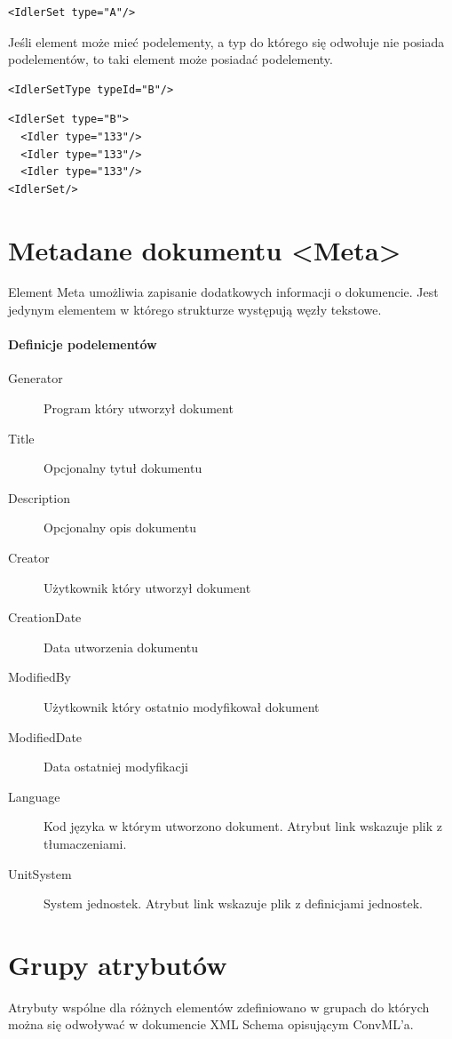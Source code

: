 \documentclass[12pt,a4paper]{article}
\begin{document}
\begin{verbatim}
<IdlerSet type="A"/>
\end{verbatim}

Jeśli element może mieć podelementy, a typ do którego się odwołuje nie posiada
podelementów, to taki element może posiadać podelementy.

\begin{verbatim}
<IdlerSetType typeId="B"/>
\end{verbatim}

\begin{verbatim}
<IdlerSet type="B">
  <Idler type="133"/>
  <Idler type="133"/>
  <Idler type="133"/>
<IdlerSet/>
\end{verbatim}

\section{Metadane dokumentu <Meta>}
Element Meta umożliwia zapisanie dodatkowych informacji o dokumencie. Jest
jedynym elementem w którego strukturze występują węzły tekstowe.

\paragraph{Definicje podelementów}
\begin{description}
\item[Generator] Program który utworzył dokument
\item[Title] Opcjonalny tytuł dokumentu
\item[Description] Opcjonalny opis dokumentu
\item[Creator] Użytkownik który utworzył dokument
\item[CreationDate] Data utworzenia dokumentu
\item[ModifiedBy] Użytkownik który ostatnio modyfikował dokument
\item[ModifiedDate] Data ostatniej modyfikacji
\item[Language] Kod języka w którym utworzono dokument.
	Atrybut link wskazuje plik z tłumaczeniami.
\item[UnitSystem] System jednostek. Atrybut link wskazuje plik z definicjami jednostek. 
\end{description}

\section{Grupy atrybutów}
Atrybuty wspólne dla różnych elementów zdefiniowano w grupach do których można
się odwoływać w dokumencie XML Schema opisującym ConvML'a.
\end{document}
